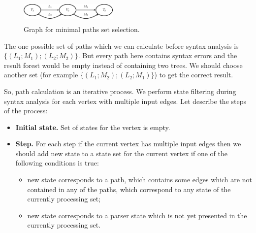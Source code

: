 \begin{figure}
    \begin{center}
        \includegraphics[width=4.8cm,height=1.2cm]{graphs/paths.eps}
        \caption{Graph for minimal paths set selection.}
        \label{pic6}
    \end{center}
\end{figure}

The one possible set of paths which we can calculate before syntax analysis is $\{(L_1; M_1); (L_2; M_2)\}$. 
But every path here contains syntax errors and the result forest would be empty instead of containing 
two trees. We should choose another set (for example $\{(L_1; M_2); (L_2; M_1)\}$) to get the correct result. 

So, path calculation is an iterative process. We perform state filtering during syntax analysis for each vertex 
with multiple input edges. Let describe the steps of the process:

\begin{itemize}
    \item \textbf{Initial state.} Set of states for the vertex is empty. 
    \item \textbf{Step.} For each step if the current vertex has multiple input edges then we should add new 
                 state to a state set for the current vertex if one of the following conditions is true:
    \begin{itemize}
        \item new state corresponds to a path, which contains some edges which are not contained in any of the paths, which correspond to any state of the currently processing set;
        \item new state corresponds to a parser state which is not yet presented in the currently processing set.
    \end{itemize}

\end{itemize}

